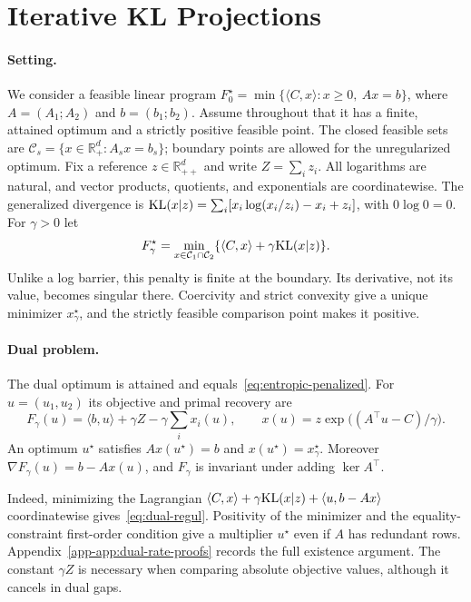 \section{Iterative KL Projections}\label{sec:general-KL-new}
\paragraph{Setting.}
We consider a feasible linear program $F_0^\star=\min\{\langle C,x\rangle:x\geq0,\ Ax=b\}$, where $A=(A_1;A_2)$ and $b=(b_1;b_2)$. Assume throughout that it has a finite, attained optimum and a strictly positive feasible point. The closed feasible sets are $\mathcal C_s=\{x\in\mathbb R_+^d:A_sx=b_s\}$; boundary points are allowed for the unregularized optimum. Fix a reference $z\in\mathbb R_{++}^d$ and write $Z=\sum_i z_i$. All logarithms are natural, and vector products, quotients, and exponentials are coordinatewise. The generalized divergence is $\mathrm{KL}(x|z)=\sum_i[x_i\log(x_i/z_i)-x_i+z_i]$, with $0\log0=0$. For $\gamma>0$ let
\begin{equation}\label{eq:entropic-penalized}
F_\gamma^\star=\min_{x\in\mathcal C_1\cap\mathcal C_2}
\{\langle C,x\rangle+\gamma\mathrm{KL}(x|z)\}.
\end{equation}
Unlike a log barrier, this penalty is finite at the boundary. Its derivative, not its value, becomes singular there. Coercivity and strict convexity give a unique minimizer $x_\gamma^\star$, and the strictly feasible comparison point makes it positive.

\paragraph{Dual problem.}\label{subsec:primal-dual}
\begin{proposition}\label{prop:dual-gamma-correct}
The dual optimum is attained and equals~\eqref{eq:entropic-penalized}. For $u=(u_1,u_2)$ its objective and primal recovery are
\begin{equation}\label{eq:dual-regul}
F_\gamma(u)=\langle b,u\rangle+\gamma Z-\gamma\sum_i x_i(u),
\qquad x(u)=z\exp\big((A^\top u-C)/\gamma\big).
\end{equation}
An optimum $u^\star$ satisfies $Ax(u^\star)=b$ and $x(u^\star)=x_\gamma^\star$. Moreover $\nabla F_\gamma(u)=b-Ax(u)$, and $F_\gamma$ is invariant under adding $\ker A^\top$.
\end{proposition}
Indeed, minimizing the Lagrangian $\langle C,x\rangle+\gamma\mathrm{KL}(x|z)+\langle u,b-Ax\rangle$ coordinatewise gives~\eqref{eq:dual-regul}. Positivity of the minimizer and the equality-constraint first-order condition give a multiplier $u^\star$ even if $A$ has redundant rows. Appendix~\ref{app-app:dual-rate-proofs} records the full existence argument. The constant $\gamma Z$ is necessary when comparing absolute objective values, although it cancels in dual gaps.

